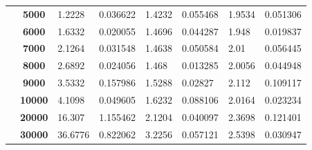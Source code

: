 \documentclass{article}
\begin{document}
\begin{table}[]
\begin{tabular}{|c|c|ll|ll|ll|}
                                           & \textbf{5000}                     & \multicolumn{1}{l|}{1.2228}        & 0.036622                          & \multicolumn{1}{l|}{1.4232}        & 0.055468                          & \multicolumn{1}{l|}{1.9534}        & 0.051306                          \\ \cline{2-8} 
                                           & \textbf{6000}                     & \multicolumn{1}{l|}{1.6332}        & 0.020055                          & \multicolumn{1}{l|}{1.4696}        & 0.044287                          & \multicolumn{1}{l|}{1.948}         & 0.019837                          \\ \cline{2-8} 
                                           & \textbf{7000}                     & \multicolumn{1}{l|}{2.1264}        & 0.031548                          & \multicolumn{1}{l|}{1.4638}        & 0.050584                          & \multicolumn{1}{l|}{2.01}          & 0.056445                          \\ \cline{2-8} 
                                           & \textbf{8000}                     & \multicolumn{1}{l|}{2.6892}        & 0.024056                          & \multicolumn{1}{l|}{1.468}         & 0.013285                          & \multicolumn{1}{l|}{2.0056}        & 0.044948                          \\ \cline{2-8} 
                                           & \textbf{9000}                     & \multicolumn{1}{l|}{3.5332}        & 0.157986                          & \multicolumn{1}{l|}{1.5288}        & 0.02827                           & \multicolumn{1}{l|}{2.112}         & 0.109117                          \\ \cline{2-8} 
                                           & \textbf{10000}                    & \multicolumn{1}{l|}{4.1098}        & 0.049605                          & \multicolumn{1}{l|}{1.6232}        & 0.088106                          & \multicolumn{1}{l|}{2.0164}        & 0.023234                          \\ \cline{2-8} 
                                           & \textbf{20000}                    & \multicolumn{1}{l|}{16.307}        & 1.155462                          & \multicolumn{1}{l|}{2.1204}        & 0.040097                          & \multicolumn{1}{l|}{2.3698}        & 0.121401                          \\ \cline{2-8} 
                                           & \textbf{30000}                    & \multicolumn{1}{l|}{36.6776}       & 0.822062                          & \multicolumn{1}{l|}{3.2256}        & 0.057121                          & \multicolumn{1}{l|}{2.5398}        & 0.030947                          \\ \cline{2-8} 

\end{tabular}
\end{table}
\end{document}

